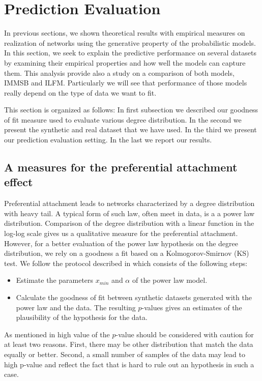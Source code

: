 \section{Prediction Evaluation}
\label{sec:experiments}

In previous sections, we shown theoretical results with empirical measures  on realization of networks using the generative property of the probabilistic models. In this section, we seek to explain the predictive performance on several datasets by examining their empirical properties and how well the models can capture them. This analysis provide also a study on a comparison of both models, IMMSB and ILFM. Particularly we will see that performance of those models really depend on the type of data we want to fit.

This section is organized as follows:  In first subsection we described our goodness of fit measure used to evaluate various degree distribution. In the second we present the synthetic and real dataset that we have used. In the third we present our prediction evaluation setting. In the last we report our results.

\subsection{A measures for the preferential attachment effect}

\label{sec:experiments-burst}
Preferential attachment leads to networks characterized by a degree distribution with heavy tail. A typical form of such law, often meet in data, is a a power law distribution. Comparison of the degree distribution with a linear function in the log-log scale  gives us a qualitative measure for the preferential attachment. However, for a better evaluation of the power law hypothesis on the degree distribution, we rely on a  goodness a fit based on a Kolmogorov-Smirnov (KS) test. We follow the protocol described in \cite{clauset2009power} which consists of the following steps:
\begin{itemize}
	\item Estimate the parameters $x_{min}$ and $\alpha$ of the power law model.
	\item Calculate the goodness of fit between synthetic datasets generated with the power law and the data. The resulting $p$-values gives an estimates of the  plausibility of the hypothesis for the data.
\end{itemize}

As mentioned in \cite{clauset2009power} high value of the $p$-value should be considered with caution for at least two reasons. First, there may be other distribution that match the data equally or better. Second, a small number of samples of the data may lead to high p-value and reflect the fact that is hard to rule out an hypothesis in such a case.

